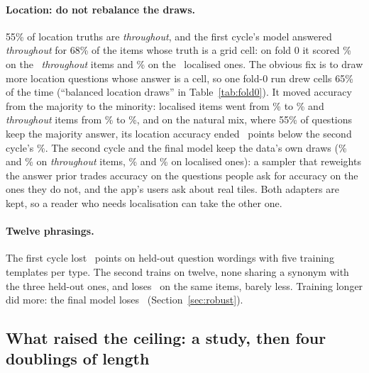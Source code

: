 \documentclass[10pt,twocolumn]{article}
\begin{document}
\paragraph{Location: do not rebalance the draws.} 55\% of location truths are \emph{throughout}, and the first cycle's model answered \emph{throughout} for 68\% of the items whose truth is a grid cell: on fold 0 it scored \voneLocThroughout\% on the \locNThroughout\ \emph{throughout} items and \voneLocLocalised\% on the \locNLocalised\ localised ones. The obvious fix is to draw more location questions whose answer is a cell, so one fold-0 run drew cells 65\% of the time (``balanced location draws'' in Table~\ref{tab:fold0}). It moved accuracy from the majority to the minority: localised items went from \voneLocLocalised\% to \balLocLocalised\% and \emph{throughout} items from \voneLocThroughout\% to \balLocThroughout\%, and on the natural mix, where 55\% of questions keep the majority answer, its location accuracy ended \balLocDrop\ points below the second cycle's \vtwoFoldLocation\%. The second cycle and the final model keep the data's own draws (\vtwoLocThroughout\% and \blipLocThroughout\% on \emph{throughout} items, \vtwoLocLocalised\% and \blipLocLocalised\% on localised ones): a sampler that reweights the answer prior trades accuracy on the questions people ask for accuracy on the ones they do not, and the app's users ask about real tiles. Both adapters are kept, so a reader who needs localisation can take the other one.

\paragraph{Twelve phrasings.} The first cycle lost \voneParaphraseDrop\ points on held-out question wordings with five training templates per type. The second trains on twelve, none sharing a synonym with the three held-out ones, and loses \vtwoParaphraseDrop\ on the same items, barely less. Training longer did more: the final model loses \blipParaphraseDrop\ (Section~\ref{sec:robust}).

\subsection{What raised the ceiling: a study, then four doublings of length}\label{sec:length}
\begin{table}[t]\centering\scriptsize
\resizebox{\columnwidth}{!}{}
\caption{The VQA study on fold 0's 1,000 inner-validation tiles: mean over question types (\%), greedy readout, and the paired change against the reference recipe at the same length (``vs 120k'': against the 120k reference) with a field-grouped 95\% interval. The interval covers item sampling, not training noise: three seeds of the reference span 56.5 to 58.2.}\label{tab:study}
\end{table}
\end{document}
